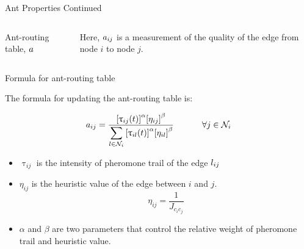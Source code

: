 \documentclass[table]{beamer}
\begin{document}
\begin{frame}{Ant Properties Continued}	
	\begin{columns}
		
		\begin{column}{0.6\textwidth}
		
		\centering
		\vspace{\baselineskip}
		\Large Ant-routing table, $ \mathnormal{a} $
		\end{column}
		\begin{column}{0.4\textwidth}
			Here, $ \mathnormal{a_{ij}} $ is a measurement of the quality of the edge from node $i$ to node $j$.
		\end{column}
	\end{columns}
\end{frame}

\begin{frame}{Formula for ant-routing table}
	
	The formula for updating the ant-routing table is:
	
	{\Large $$
		\Large a_{ij} = \frac { {[\uptau_{ij}(t)]}^{\alpha} {[\eta_{ij}]}^{\beta} }
		{\displaystyle\sum_{l \in \mathcal{N}_i} {[\uptau_{il}(t)]}^{\alpha} {[\eta_{il}]}^{\beta} } 
		\ \ \ \ \ \ \ \forall j \in \mathcal{N}_i
		$$}
	
	
	\begin{itemize}
		\item  $ {\uptau_{ij}} $ is the intensity of pheromone trail of the  edge $ 	\mathnormal{l_{ij}} $
		
		\item $ {\eta_{ij}} $ is the heuristic value of the edge between $i$ and $j$.	
		{\Large $$ {\eta_{ij}} = \frac{1}{J_{c_ic_j}} $$ }
		
		\item $\alpha$ and $\beta$ are two parameters that control the relative weight of pheromone trail and heuristic value. 
	\end{itemize}
	
\end{frame}
\end{document}
